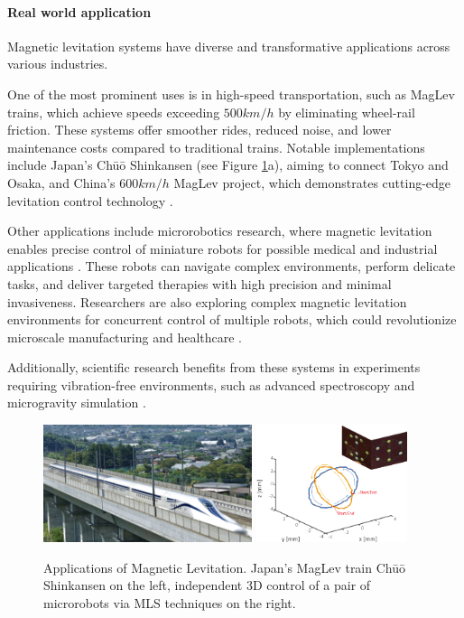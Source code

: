 \paragraph{Real world application}

Magnetic levitation systems have diverse and transformative applications across various industries.

One of the most prominent uses is in high-speed transportation, such as MagLev trains, which achieve speeds exceeding $500 km/h$ by eliminating wheel-rail friction.
These systems offer smoother rides, reduced noise, and lower maintenance costs compared to traditional trains.
Notable implementations include Japan's Chūō Shinkansen (see Figure \ref{fig:mls_applications}a), aiming to connect Tokyo and Osaka, and China's $600 km/h$ MagLev project, which demonstrates cutting-edge levitation control technology \cite{WikiSCMaglev}.

Other applications include microrobotics research, where magnetic levitation enables precise control of miniature robots for possible medical and industrial applications \cite{microrobotsControl}.
These robots can navigate complex environments, perform delicate tasks, and deliver targeted therapies with high precision and minimal invasiveness.
Researchers are also exploring complex magnetic levitation environments for concurrent control of multiple robots, which could revolutionize microscale manufacturing and healthcare \cite{Independent3DControl}.

Additionally, scientific research benefits from these systems in experiments requiring vibration-free environments, such as advanced spectroscopy \cite{spectroscopy} and microgravity simulation \cite{microgravity}.


\begin{figure}[H]
    \centering
    \includegraphics[height=130px]{./img/Chuo_Shinkansen.jpg}
    \hspace{1cm}
    \includegraphics[height=130px]{./img/3D_magnetic_dual_control.png}
    \caption{
        Applications of Magnetic Levitation.
        Japan's MagLev train Chūō Shinkansen \cite{WikiSCMaglev} on the left, independent 3D control of a pair of microrobots via MLS techniques \cite{Independent3DControl} on the right.
    }
    \label{fig:mls_applications}
\end{figure}

